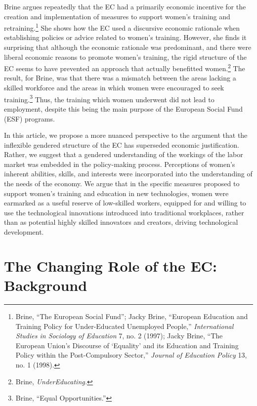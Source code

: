 \documentclass{tufte-handout}
\begin{document}
Brine argues repeatedly that the EC had a primarily economic incentive
for the creation and implementation of measures to support women's
training and retraining.\footnote{Brine, ``The European Social Fund'';
  Jacky Brine, ``European Education and Training Policy for
  Under-Educated Unemployed People,'' \emph{International Studies in
  Sociology of Education} 7, no. 2 (1997); Jacky Brine, ``The European
  Union's Discourse of `Equality' and its Education and Training Policy
  within the Post-Compulsory Sector,'' \emph{Journal of Education
  Policy} 13, no. 1 (1998).} She shows how the EC used a discursive
economic rationale when establishing policies or advice related to
women's training. However, she finds it surprising that although the
economic rationale was predominant, and there were liberal economic
reasons to promote women's training, the rigid structure of the EC seems
to have prevented an approach that actually benefitted women.\footnote{Brine,
  \emph{UnderEducating.}} The result, for Brine, was that there was a
mismatch between the areas lacking a skilled workforce and the areas in
which women were encouraged to seek training.\footnote{Brine, ``Equal
  Opportunities.''} Thus, the training which women underwent did not
lead to employment, despite this being the main purpose of the European
Social Fund (ESF) programs.

In this article, we propose a more nuanced perspective to the argument
that the inflexible gendered structure of the EC has superseded economic
justification. Rather, we suggest that a gendered understanding of the
workings of the labor market was embedded in the policy-making process.
Perceptions of women's inherent abilities, skills, and interests were
incorporated into the understanding of the needs of the economy. We
argue that in the specific measures proposed to support women's training
and education in new technologies, women were earmarked as a useful
reserve of low-skilled workers, equipped for and willing to use the
technological innovations introduced into traditional workplaces, rather
than as potential highly skilled innovators and creators, driving
technological development.

\hypertarget{the-changing-role-of-the-ec-background}{%
\section{The Changing Role of the EC:
Background}\label{the-changing-role-of-the-ec-background}}
\end{document}
